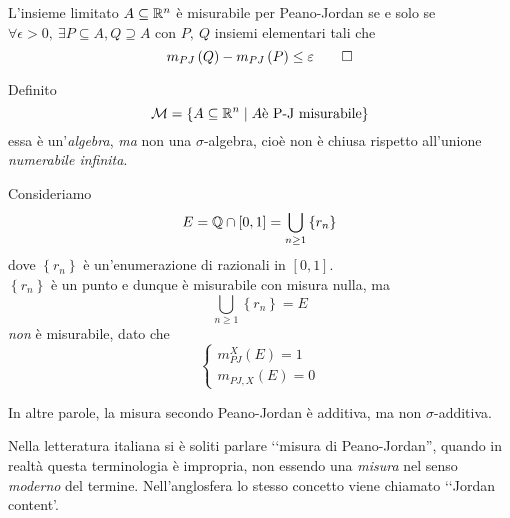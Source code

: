 	\begin{propositionqed}
		L'insieme limitato $A\subseteq \realset^n$ è misurabile per Peano-Jordan se e solo se $\forall \epsilon>0,\ \exists P\subseteq A, Q\supseteq A$ con $P,\ Q$ insiemi elementari tali che
		\begin{equation}
			m_{PJ}\left(Q\right)-m_{PJ}\left(P\right)\leq \epsilon\qedhere
		\end{equation}
	\end{propositionqed}
	Definito
	\begin{equation}
		\mathcal{M}=\left\{A\subseteq \realset^n\mid A\text{è P-J misurabile}\right\}
	\end{equation}
	essa è un'\textit{algebra}, \textit{ma} non una $\sigma$-algebra, cioè non è chiusa rispetto all'unione \textit{numerabile infinita}.
	\begin{examplewt}
		Consideriamo
		\begin{equation*}
			E=\rationalset\cap\left[0,1\right]=\bigcup_{n\geq 1}\left\{r_n\right\}
		\end{equation*}
		dove $\left\{r_n\right\}$ è un'enumerazione di razionali in $\left[0,1\right]$.\\
		$\left\{r_n\right\}$ è un punto e dunque è misurabile con misura nulla, ma \begin{equation*}
			\bigcup_{n\geq 1}\left\{r_n\right\}=E
		\end{equation*}
		\textit{non} è misurabile, dato che
		\begin{equation*}
			\begin{cases}
				m_{PJ}^X\left(E\right)=1\\
				m_{PJ,X}\left(E\right)=0
			\end{cases}
		\end{equation*}
	\end{examplewt}
	In altre parole, la misura secondo Peano-Jordan è additiva, ma non $\sigma$-additiva.
	\begin{digression}
		Nella letteratura italiana si è soliti parlare ‘‘misura di Peano-Jordan'', quando in realtà questa terminologia è impropria, non essendo una \textit{misura} nel senso \textit{moderno} del termine. Nell'anglosfera lo stesso concetto viene chiamato ‘‘Jordan content'.
	\end{digression}

